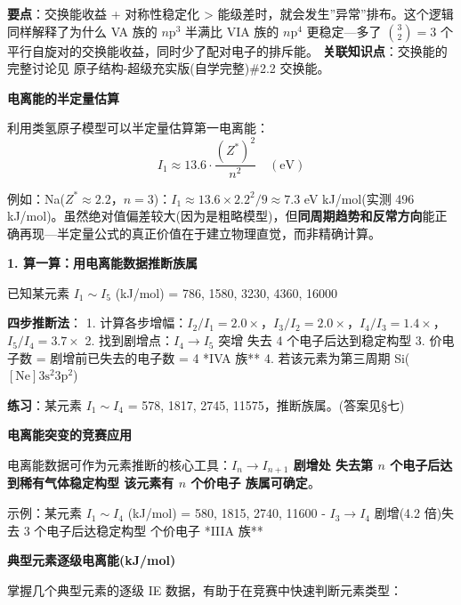 \textbf{要点}：交换能收益 + 对称性稳定化 \textgreater{} 能级差时，就会发生''异常''排布。这个逻辑同样解释了为什么 VA 族的 \(n\mathrm{p}^3\) 半满比 VIA 族的 \(n\mathrm{p}^4\) 更稳定---多了 \(\binom{3}{2}=3\) 个平行自旋对的交换能收益，同时少了配对电子的排斥能。
\textbf{关联知识点}：交换能的完整讨论见 原子结构-超级充实版(自学完整)\#2.2 交换能。

\textbf{电离能的半定量估算}

利用类氢原子模型可以半定量估算第一电离能：
\[I_1 \approx 13.6 \cdot \frac{(Z^*)^2}{n^2} \quad (\text{eV})\]

例如：Na(\(Z^*\approx2.2\)，\(n=3\))：\(I_1 \approx 13.6 \times 2.2^2/9 \approx 7.3\) eV  kJ/mol(实测 496 kJ/mol)。虽然绝对值偏差较大(因为是粗略模型)，但\textbf{同周期趋势和反常方向}能正确再现---半定量公式的真正价值在于建立物理直觉，而非精确计算。

\textbf{1. 算一算：用电离能数据推断族属}

已知某元素 \(I_1\sim I_5\) (kJ/mol) = 786, 1580, 3230, 4360, 16000

\textbf{四步推断法}：
1. 计算各步增幅：\(I_2/I_1=2.0\times\)，\(I_3/I_2=2.0\times\)，\(I_4/I_3=1.4\times\)，\(I_5/I_4=3.7\times\)
2. 找到剧增点：\(I_4\to I_5\) 突增 \箭 失去 4 个电子后达到稳定构型
3. 价电子数 = 剧增前已失去的电子数 = 4 \箭 **IVA 族**
4. 若该元素为第三周期 \箭 Si(\([\mathrm{Ne}]3\mathrm{s}^2 3\mathrm{p}^2\))

\textbf{练习}：某元素 \(I_1\sim I_4\) = 578, 1817, 2745, 11575，推断族属。(答案见§七)

\textbf{电离能突变的竞赛应用}

电离能数据可作为元素推断的核心工具：\textbf{\(I_n \to I_{n+1}\) 剧增处 \箭 失去第 \(n\) 个电子后达到稀有气体稳定构型 \箭 该元素有 \(n\) 个价电子 \箭 族属可确定}。

示例：某元素 \(I_1\sim I_4\) (kJ/mol) = 580, 1815, 2740, 11600
- \(I_3\to I_4\) 剧增(4.2 倍)\箭 失去 3 个电子后达稳定构型  个价电子 \箭 **IIIA 族**

\textbf{典型元素逐级电离能(kJ/mol)}

掌握几个典型元素的逐级 IE 数据，有助于在竞赛中快速判断元素类型：

